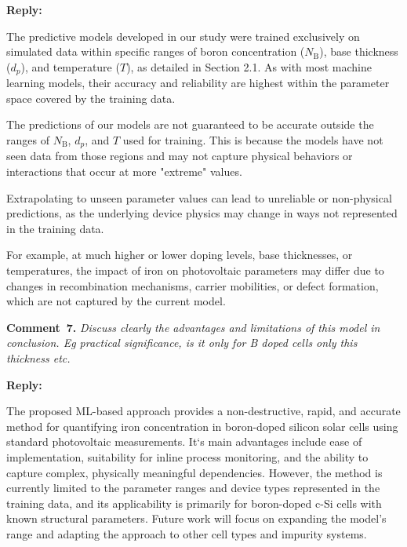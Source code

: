 \documentclass[a4paper,fleqn]{cas-sc}
\begin{document}
\noindent
\textcolor[rgb]{0.51,0.00,0.00}{\textbf{Reply:}}


The predictive models developed in our study were trained exclusively on simulated data within specific ranges of boron concentration ($N_\mathrm{B}$), base thickness ($d_p$), and temperature ($T$), as detailed in Section 2.1. 
As with most machine learning models, their accuracy and reliability are highest within the parameter space covered by the training data.


The predictions of our models are not guaranteed to be accurate outside the ranges of $N_\mathrm{B}$, $d_p$, and $T$ used for training. 
This is because the models have not seen data from those regions and may not capture physical behaviors or interactions that occur at more "extreme" values.


Extrapolating to unseen parameter values can lead to unreliable or non-physical predictions, as the underlying device physics may change in ways not represented in the training data.


For example, at much higher or lower doping levels, base thicknesses, or temperatures, the impact of iron on photovoltaic parameters may differ due to changes in recombination mechanisms, carrier mobilities, or defect formation, which are not captured by the current model.


\vspace{1cm}
\noindent
\textcolor[rgb]{0.00,0.50,1.00}{\textbf{Comment~7.}}
\emph{Discuss clearly the advantages and limitations of this model in conclusion. Eg practical significance, is it only for B doped cells only this thickness etc.}

\noindent
\textcolor[rgb]{0.51,0.00,0.00}{\textbf{Reply:}}

The proposed ML-based approach provides a non-destructive, rapid, and accurate method for quantifying iron concentration in boron-doped silicon solar cells using standard photovoltaic measurements. 
It`s main advantages include ease of implementation, suitability for inline process monitoring, and the ability to capture complex, physically meaningful dependencies. 
However, the method is currently limited to the parameter ranges and device types represented in the training data, and its applicability is primarily for boron-doped c-Si cells with known structural parameters. 
Future work will focus on expanding the model’s range and adapting the approach to other cell types and impurity systems.



\end{document}
